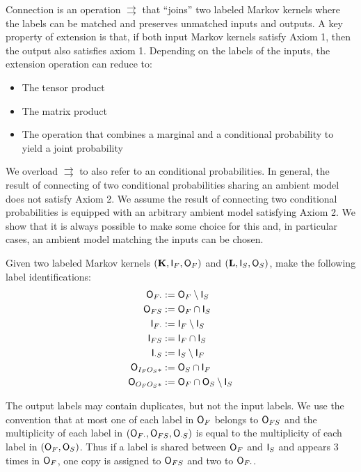 Connection is an operation $\rightrightarrows$ that ``joins'' two labeled Markov kernels where the labels can be matched and preserves unmatched inputs and outputs. A key property of extension is that, if both input Markov kernels satisfy Axiom 1, then the output also satisfies axiom 1. Depending on the labels of the inputs, the extension operation can reduce to:
\begin{itemize}
	\item The tensor product
	\item The matrix product
	\item The operation that combines a marginal and a conditional probability to yield a joint probability
\end{itemize}

We overload $\rightrightarrows$ to also refer to an conditional probabilities. In general, the result of connecting of two conditional probabilities sharing an ambient model does not satisfy Axiom 2. We assume the result of connecting two conditional probabilities is equipped with an arbitrary ambient model satisfying Axiom 2. We show that it is always possible to make some choice for this and, in particular cases, an ambient model matching the inputs can be chosen.

Given two labeled Markov kernels $(\mathbf{K},\mathsf{I}_F,\mathsf{O}_F)$ and $(\mathbf{L},\mathsf{I}_S,\mathsf{O}_S)$, make the following label identifications:
\begin{align}
	\mathsf{O}_{F\cdot}&:=\mathsf{O}_F\setminus\mathsf{I}_S\\
	\mathsf{O}_{FS}&:=\mathsf{O}_F\cap\mathsf{I}_S\\
	\mathsf{I}_{F\cdot} &:= \mathsf{I}_F\setminus \mathsf{I}_S\\
	\mathsf{I}_{FS}&:= \mathsf{I}_F\cap\mathsf{I}_S\\
	\mathsf{I}_{\cdot S}&:= \mathsf{I}_S\setminus \mathsf{I}_F\\
	\mathsf{O}_{I_FO_S*}&:=\mathsf{O}_S\cap \mathsf{I}_F\\
	\mathsf{O}_{O_FO_S*} &:= \mathsf{O}_F\cap\mathsf{O}_S\setminus \mathsf{I}_S\\
\end{align}

The output labels may contain duplicates, but not the input labels. We use the convention that at most one of each label in $\mathsf{O}_F$ belongs to $\mathsf{O}_{FS}$ and the multiplicity of each label in $(\mathsf{O}_{F\cdot},\mathsf{O}_{FS},\mathsf{O}_{\cdot S})$ is equal to the multiplicity of each label in $(\mathsf{O}_F,\mathsf{O}_S)$. Thus if a label is shared between $\mathsf{O}_F$ and $\mathsf{I}_S$ and appears 3 times in $\mathsf{O}_F$, one copy is assigned to $\mathsf{O}_{FS}$ and two to $\mathsf{O}_{F\cdot}$.

